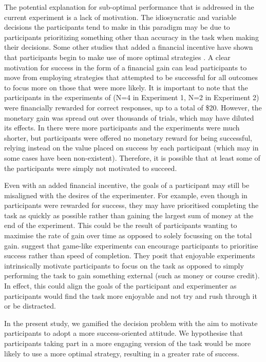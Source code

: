 \documentclass[vision,article,submit,moreauthors,pdftex,10pt,a4paper]{mdpi}
\begin{document}
The potential explanation for sub-optimal performance that is addressed in the current experiment is a lack of motivation. The idiosyncratic and variable decisions the participants tend to make in this paradigm may be due to participants prioritizing something other than accuracy in the task when making their decisions. Some other studies that added a financial incentive have shown that participants begin to make use of more optimal strategies \cite{Goodnow1955,phillips1966conservatism}. A clear motivation for success in the form of a financial gain can lead participants to move from employing strategies that attempted to be successful for all outcomes to focus more on those that were more likely. It is important to note that the participants in the experiments of \citeauthor{morvan2012human} \cite{morvan2012human} (N=4 in Experiment 1, N=2 in Experiment 2) were financially rewarded for correct responses, up to a total of \$20. However, the monetary gain was spread out over thousands of trials, which may have diluted its effects. In \cite{clarke2015failure} there were more participants and the experiments were much shorter, but participants were offered no monetary reward for being successful, relying instead on the value placed on success by each participant (which may in some cases have been non-existent). Therefore, it is possible that at least some of the participants were simply not motivated to succeed. 

Even with an added financial incentive, the goals of a participant may still be misaligned with the desires of the experimenter. For example, even though in \citeauthor{morvan2012human} \cite{morvan2012human} participants were rewarded for success, they may have prioritised completing the task as quickly as possible rather than gaining the largest sum of money at the end of the experiment. This could be the result of participants wanting to maximise the rate of gain over time as opposed to solely focussing on the total gain. \citeauthor{miranda2014intrinsic} \cite{miranda2014intrinsic} suggest that game-like experiments can encourage participants to prioritise success rather than speed of completion. They posit that enjoyable experiments intrinsically motivate participants to focus on the task as opposed to simply performing the task to gain something external (such as money or course credit). In effect, this could align the goals of the participant and experimenter as participants would find the task more enjoyable and not try and rush through it or be distracted. 

In the present study, we gamified the decision problem with the aim to motivate participants to adopt a more success-oriented attitude. We hypothesise that participants taking part in a more engaging version of the task would be more likely to use a more optimal strategy, resulting in a greater rate of success. 
\end{document}
